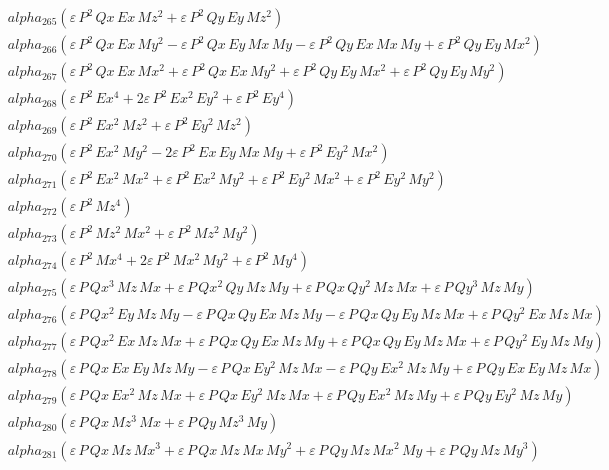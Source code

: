 \documentclass{article}
\begin{document}
\begin{align*}
  &\quad alpha_{265} \left(ε\,P^{2}\,Qx\,Ex\,Mz^{2} + ε\,P^{2}\,Qy\,Ey\,Mz^{2}\right) \\
  &\quad alpha_{266} \left(ε\,P^{2}\,Qx\,Ex\,My^{2} -ε\,P^{2}\,Qx\,Ey\,Mx\,My -ε\,P^{2}\,Qy\,Ex\,Mx\,My + ε\,P^{2}\,Qy\,Ey\,Mx^{2}\right) \\
  &\quad alpha_{267} \left(ε\,P^{2}\,Qx\,Ex\,Mx^{2} + ε\,P^{2}\,Qx\,Ex\,My^{2} + ε\,P^{2}\,Qy\,Ey\,Mx^{2} + ε\,P^{2}\,Qy\,Ey\,My^{2}\right) \\
  &\quad alpha_{268} \left(ε\,P^{2}\,Ex^{4} + 2ε\,P^{2}\,Ex^{2}\,Ey^{2} + ε\,P^{2}\,Ey^{4}\right) \\
  &\quad alpha_{269} \left(ε\,P^{2}\,Ex^{2}\,Mz^{2} + ε\,P^{2}\,Ey^{2}\,Mz^{2}\right) \\
  &\quad alpha_{270} \left(ε\,P^{2}\,Ex^{2}\,My^{2} - 2ε\,P^{2}\,Ex\,Ey\,Mx\,My + ε\,P^{2}\,Ey^{2}\,Mx^{2}\right) \\
  &\quad alpha_{271} \left(ε\,P^{2}\,Ex^{2}\,Mx^{2} + ε\,P^{2}\,Ex^{2}\,My^{2} + ε\,P^{2}\,Ey^{2}\,Mx^{2} + ε\,P^{2}\,Ey^{2}\,My^{2}\right) \\
  &\quad alpha_{272} \left(ε\,P^{2}\,Mz^{4}\right) \\
  &\quad alpha_{273} \left(ε\,P^{2}\,Mz^{2}\,Mx^{2} + ε\,P^{2}\,Mz^{2}\,My^{2}\right) \\
  &\quad alpha_{274} \left(ε\,P^{2}\,Mx^{4} + 2ε\,P^{2}\,Mx^{2}\,My^{2} + ε\,P^{2}\,My^{4}\right) \\
  &\quad alpha_{275} \left(ε\,P\,Qx^{3}\,Mz\,Mx + ε\,P\,Qx^{2}\,Qy\,Mz\,My + ε\,P\,Qx\,Qy^{2}\,Mz\,Mx + ε\,P\,Qy^{3}\,Mz\,My\right) \\
  &\quad alpha_{276} \left(ε\,P\,Qx^{2}\,Ey\,Mz\,My -ε\,P\,Qx\,Qy\,Ex\,Mz\,My -ε\,P\,Qx\,Qy\,Ey\,Mz\,Mx + ε\,P\,Qy^{2}\,Ex\,Mz\,Mx\right) \\
  &\quad alpha_{277} \left(ε\,P\,Qx^{2}\,Ex\,Mz\,Mx + ε\,P\,Qx\,Qy\,Ex\,Mz\,My + ε\,P\,Qx\,Qy\,Ey\,Mz\,Mx + ε\,P\,Qy^{2}\,Ey\,Mz\,My\right) \\
  &\quad alpha_{278} \left(ε\,P\,Qx\,Ex\,Ey\,Mz\,My -ε\,P\,Qx\,Ey^{2}\,Mz\,Mx -ε\,P\,Qy\,Ex^{2}\,Mz\,My + ε\,P\,Qy\,Ex\,Ey\,Mz\,Mx\right) \\
  &\quad alpha_{279} \left(ε\,P\,Qx\,Ex^{2}\,Mz\,Mx + ε\,P\,Qx\,Ey^{2}\,Mz\,Mx + ε\,P\,Qy\,Ex^{2}\,Mz\,My + ε\,P\,Qy\,Ey^{2}\,Mz\,My\right) \\
  &\quad alpha_{280} \left(ε\,P\,Qx\,Mz^{3}\,Mx + ε\,P\,Qy\,Mz^{3}\,My\right) \\
  &\quad alpha_{281} \left(ε\,P\,Qx\,Mz\,Mx^{3} + ε\,P\,Qx\,Mz\,Mx\,My^{2} + ε\,P\,Qy\,Mz\,Mx^{2}\,My + ε\,P\,Qy\,Mz\,My^{3}\right) \\

\end{align*}
\end{document}
